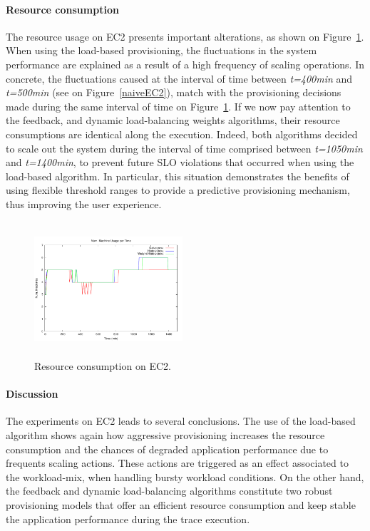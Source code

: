 \paragraph{Resource consumption}

The resource usage on EC2 presents important alterations, as shown on Figure~\ref{resEC2}. When using the load-based provisioning, the fluctuations in the system performance are explained as a result of a high frequency of scaling operations. In concrete, the fluctuations caused at the interval of time between \emph{t=400min} and \emph{t=500min} (see on Figure~\ref{naiveEC2}), match with the provisioning decisions made during the same interval of time on Figure~\ref{resEC2}. If we now pay attention to the feedback, and dynamic load-balancing weights algorithms, their resource consumptions are identical along the execution. Indeed, both algorithms decided to scale out the system during the interval of time comprised between \emph{t=1050min} and \emph{t=1400min}, to prevent future SLO violations that occurred when using the load-based algorithm. In particular, this situation demonstrates the benefits of using flexible threshold ranges to provide a predictive provisioning mechanism, thus improving the user experience.


\begin{figure}
\begin{center}
\includegraphics[width=0.49\textwidth, height=5cm]{./images/heterogeneous/numMachinesCompEC2}
\end{center}
\caption{Resource consumption on EC2.}
\label{resEC2}
\end{figure}


\paragraph{Discussion}
The experiments on EC2 leads to several conclusions. The use of the load-based algorithm shows again how aggressive provisioning increases the resource consumption and the chances of degraded application performance due to frequents scaling actions. These actions are triggered as an effect associated to the workload-mix, when handling bursty workload conditions. On the other hand, the feedback and dynamic load-balancing algorithms constitute two robust provisioning models that offer an efficient resource consumption and keep stable the application performance during the trace execution. 

